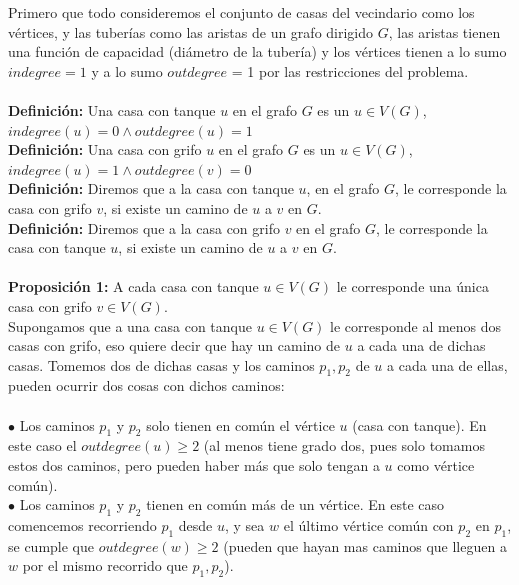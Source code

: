 \documentclass{article}
\begin{document}
    Primero que todo consideremos el conjunto de casas del vecindario como los v\'ertices, y las tuber\'ias como las aristas de un grafo
    dirigido  $G$, las aristas tienen una funci\'on de capacidad (di\'ametro de la tuber\'ia) y los v\'ertices tienen a lo sumo $indegree = 1$
    y a lo sumo $outdegree$ = 1 por las restricciones del problema.\\\\

    \noindent \textbf{Definici\'on:} Una casa con tanque $u$ en el grafo $G$ es un $u \in V(G)$,\\ $indegree(u) = 0 \wedge outdegree(u) = 1$\\

    \noindent \textbf{Definici\'on:} Una casa con grifo $u$ en el grafo $G$ es un $u \in V(G)$,\\ $indegree(u) = 1 \wedge outdegree(v) = 0$\\

    \noindent \textbf{Definici\'on:} Diremos que a la casa con tanque $u$, en el grafo $G$, le corresponde la casa con grifo
     $v$, si existe un camino de $u$ a $v$ en $G$.\\

     \noindent \textbf{Definici\'on:} Diremos que a la casa con grifo $v$ en el 
    grafo $G$, le corresponde la casa con tanque $u$, si existe un camino de $u$ a $v$ en $G$.\\\\

    \noindent \textbf{Proposici\'on 1:} A cada casa con tanque $u \in V(G)$ le corresponde una \'unica casa con grifo $v \in V(G)$.\\

    Supongamos que a una casa con tanque $u \in V(G)$ le corresponde al menos dos casas con grifo, eso quiere decir
    que hay un camino de $u$ a cada una de dichas casas. Tomemos dos de dichas casas y los caminos $p_1, p_2$ de $u$
    a cada una de ellas, pueden ocurrir dos cosas con dichos caminos:\\\\

    $\bullet$ Los caminos $p_1$ y $p_2$ solo tienen en com\'un el v\'ertice $u$ (casa con tanque). En este caso
    el $outdegree(u) \geq 2$ (al menos tiene grado dos, pues solo tomamos estos dos caminos, pero pueden haber m\'as que
    solo tengan a $u$ como v\'ertice com\'un).\\

    $\bullet$ Los caminos $p_1$ y $p_2$ tienen en com\'un m\'as de un v\'ertice. En este caso comencemos recorriendo $p_1$ desde
    $u$, y sea $w$ el \'ultimo v\'ertice com\'un con $p_2$ en $p_1$, se cumple que $outdegree(w) \geq 2$ (pueden que hayan mas caminos
    que lleguen a $w$ por el mismo recorrido que $p_1, p_2$).\\\\
\end{document}
